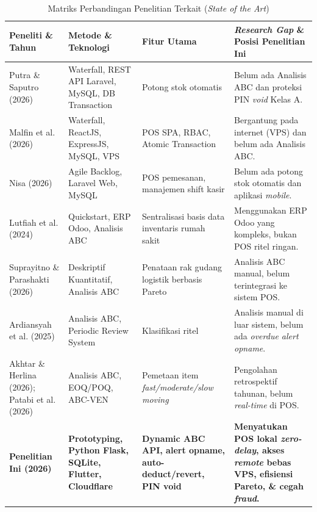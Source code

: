 \documentclass[11pt, a4paper]{article}
\begin{document}
\begin{table}[!htbp]
\centering
\caption{Matriks Perbandingan Penelitian Terkait (\textit{State of the Art})}
\label{tab:state_of_the_art}
\small
\renewcommand{\arraystretch}{1.25}
\begin{tabularx}{\textwidth}{>{\raggedright\arraybackslash}p{2.6cm} >{\raggedright\arraybackslash}p{3.0cm} >{\raggedright\arraybackslash}p{3.2cm} >{\raggedright\arraybackslash}X}
\toprule
\textbf{Peneliti \& Tahun} & \textbf{Metode \& Teknologi} & \textbf{Fitur Utama} & \textbf{\textit{Research Gap} \& Posisi Penelitian Ini} \\
\midrule
Putra \& Saputro (2026) & Waterfall, REST API Laravel, MySQL, DB Transaction & Potong stok otomatis & Belum ada Analisis ABC dan proteksi PIN \textit{void} Kelas A. \\ \addlinespace[0.3em]
Malfin et al. (2026) & Waterfall, ReactJS, ExpressJS, MySQL, VPS & POS SPA, RBAC, Atomic Transaction & Bergantung pada internet (VPS) dan belum ada Analisis ABC. \\ \addlinespace[0.3em]
Nisa (2026) & Agile Backlog, Laravel Web, MySQL & POS pemesanan, manajemen shift kasir & Belum ada potong stok otomatis dan aplikasi \textit{mobile}. \\ \addlinespace[0.3em]
Lutfiah et al. (2024) & Quickstart, ERP Odoo, Analisis ABC & Sentralisasi basis data inventaris rumah sakit & Menggunakan ERP Odoo yang kompleks, bukan POS ritel ringan. \\ \addlinespace[0.3em]
Suprayitno \& Parashakti (2026) & Deskriptif Kuantitatif, Analisis ABC & Penataan rak gudang logistik berbasis Pareto & Analisis ABC manual, belum terintegrasi ke sistem POS. \\ \addlinespace[0.3em]
Ardiansyah et al. (2025) & Analisis ABC, Periodic Review System & Klasifikasi ritel & Analisis manual di luar sistem, belum ada \textit{overdue alert opname}. \\ \addlinespace[0.3em]
Akhtar \& Herlina (2026); Patabi et al. (2026) & Analisis ABC, EOQ/POQ, ABC-VEN & Pemetaan item \textit{fast/moderate/slow moving} & Pengolahan retrospektif tahunan, belum \textit{real-time} di POS. \\ \midrule
\rowcolor{gray!12}
\textbf{Penelitian Ini (2026)} & \textbf{Prototyping, Python Flask, SQLite, Flutter, Cloudflare} & \textbf{Dynamic ABC API, alert opname, auto-deduct/revert, PIN void} & \textbf{Menyatukan POS lokal \textit{zero-delay}, akses \textit{remote} bebas VPS, efisiensi Pareto, \& cegah \textit{fraud}.} \\
\bottomrule
\end{tabularx}
\end{table}
\end{document}
